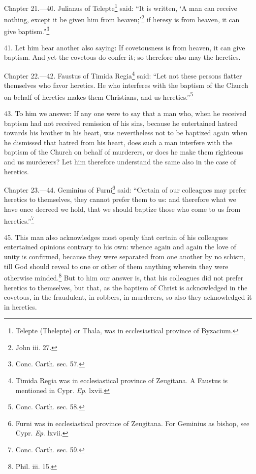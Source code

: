 
Chapter 21.—40. Julianus of Telepte\footnote{\par  Telepte (Thelepte) or Thala, was in ecclesiastical province of Byzacium.} said: ``It is written, ‘A man can receive nothing, except it be given him from heaven;’\footnote{\par  John iii. 27.} if heresy is from heaven, it can give baptism.''\footnote{\par  Conc. Carth. sec. 57.}

41. Let him hear another also saying: If covetousness is from heaven, it can give baptism. And yet the covetous do confer it; so therefore also may the heretics.


Chapter 22.—42. Faustus of Timida Regia\footnote{\par  Timida Regia was in ecclesiastical province of Zeugitana. A Faustus is mentioned in Cypr. \emph{Ep}. lxvii.} said: ``Let not these persons flatter themselves who favor heretics. He who interferes with the baptism of the Church on behalf of heretics makes them Christians, and us heretics.''\footnote{\par  Conc. Carth. sec. 58.}

43. To him we answer: If any one were to say that a man who, when he received baptism had not received remission of his sins, because he entertained hatred towards his brother in his heart, was nevertheless not to be baptized again when he dismissed that hatred from his heart, does such a man interfere with the baptism of the Church on behalf of murderers, or does he make them righteous and us murderers? Let him therefore understand the same also in the case of heretics.


Chapter 23.—44. Geminius of Furni\footnote{\par  Furni was in ecclesiastical province of Zeugitana. For Geminius as bishop, see Cypr. \emph{Ep}. lxvii.} said: ``Certain of our colleagues may prefer heretics to themselves, they cannot prefer them to us: and therefore what we have once decreed we hold, that we should baptize those who come to us from heretics.''\footnote{\par  Conc. Carth. sec. 59.}

45. This man also acknowledges most openly that certain of his colleagues entertained opinions contrary to his own: whence again and again the love of unity is confirmed, because they were separated from one another by no schism, till God should reveal to one or other of them anything wherein they were otherwise minded.\footnote{\par  Phil. iii. 15.} But to him our answer is, that his colleagues did not prefer heretics to themselves, but that, as the baptism of Christ is acknowledged in the covetous, in the fraudulent, in robbers, in murderers, so also they acknowledged it in heretics.

